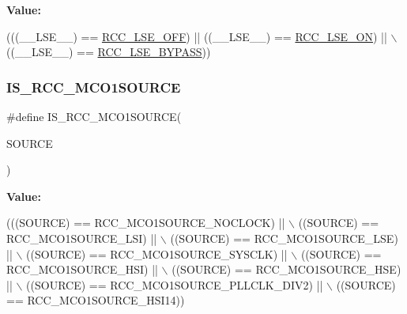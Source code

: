 {\bfseries Value\+:}
\begin{DoxyCode}
(((\_\_LSE\_\_) == \hyperlink{group___r_c_c___l_s_e___config_ga6645c27708d0cad1a4ab61d2abb24c77}{RCC\_LSE\_OFF}) || ((\_\_LSE\_\_) == \hyperlink{group___r_c_c___l_s_e___config_gac981ea636c2f215e4473901e0912f55a}{RCC\_LSE\_ON}) || \(\backslash\)
                             ((\_\_LSE\_\_) == \hyperlink{group___r_c_c___l_s_e___config_gaad580157edbae878edbcc83c5a68e767}{RCC\_LSE\_BYPASS}))
\end{DoxyCode}
\mbox{\label{group___r_c_c___private___macros_ga073031d9c90c555f7874912b7e4905f6}} 
\subsubsection{\texorpdfstring{I\+S\+\_\+\+R\+C\+C\+\_\+\+M\+C\+O1\+S\+O\+U\+R\+CE}{IS\_RCC\_MCO1SOURCE}}
{\footnotesize\ttfamily \#define I\+S\+\_\+\+R\+C\+C\+\_\+\+M\+C\+O1\+S\+O\+U\+R\+CE(\begin{DoxyParamCaption}\item[{}]{S\+O\+U\+R\+CE }\end{DoxyParamCaption})}

{\bfseries Value\+:}
\begin{DoxyCode}
(((SOURCE) == RCC\_MCO1SOURCE\_NOCLOCK)     || \(\backslash\)
                                   ((SOURCE) == RCC\_MCO1SOURCE\_LSI)          || \(\backslash\)
                                   ((SOURCE) == RCC\_MCO1SOURCE\_LSE)          || \(\backslash\)
                                   ((SOURCE) == RCC\_MCO1SOURCE\_SYSCLK)       || \(\backslash\)
                                   ((SOURCE) == RCC\_MCO1SOURCE\_HSI)          || \(\backslash\)
                                   ((SOURCE) == RCC\_MCO1SOURCE\_HSE)          || \(\backslash\)
                                   ((SOURCE) == RCC\_MCO1SOURCE\_PLLCLK\_DIV2)  || \(\backslash\)
                                   ((SOURCE) == RCC\_MCO1SOURCE\_HSI14))
\end{DoxyCode}
\mbox{\label{group___r_c_c___private___macros_ga3da0bb3923503cb8e84e5bd75912fbb8}} 

